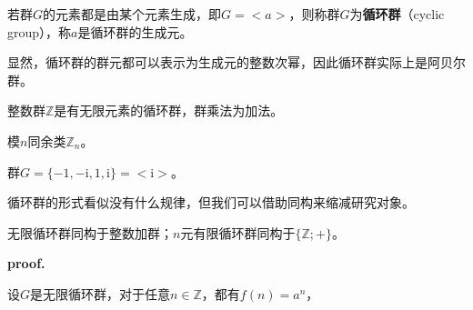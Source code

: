 
\begin{definition}{}
若群$G$的元素都是由某个元素生成，即$G=<a>$，则称群$G$为\textbf{循环群}（cyclic group），称$a$是循环群的生成元。
\end{definition}

显然，循环群的群元都可以表示为生成元的整数次幂，因此循环群实际上是阿贝尔群。
\begin{example}{}
整数群$\mathbb Z$是有无限元素的循环群，群乘法为加法。
\end{example}
\begin{example}{}
模$n$同余类$\mathbb Z_n$。
\end{example}
\begin{example}{}
群$G=\{-1,-\mathrm i,1,\mathrm i\}=<\mathrm i>$。
\end{example}
循环群的形式看似没有什么规律，但我们可以借助同构来缩减研究对象。
\begin{theorem}{}
无限循环群同构于整数加群；$n$元有限循环群同构于$\{\mathbb Z;+\}$。
\end{theorem}
\textbf{proof.}

设$G$是无限循环群，对于任意$n\in \mathbb Z$，都有$f(n)=a^n$，